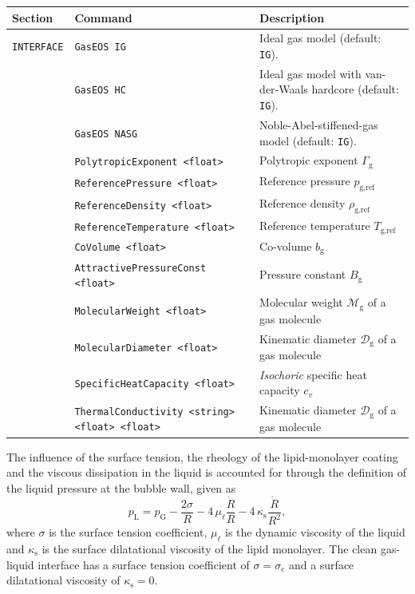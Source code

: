 \noindent
\begin{tabular}{p{} p{} p{}}
    \textbf{Section} &\textbf{Command} & \textbf{Description} 
\vspace{1mm} \\ \hline
{\tt INTERFACE} & {\tt GasEOS IG} & Ideal gas model (default: {\tt IG}).\\ 
& {\tt GasEOS HC} & Ideal gas model with van-der-Waals hardcore (default: {\tt IG}).\\ 
& {\tt GasEOS NASG} & Noble-Abel-stiffened-gas model (default: {\tt IG}).\\ 
& {\tt PolytropicExponent <float>} & Polytropic exponent $\Gamma_\text{g}$\\
& {\tt ReferencePressure <float>} & Reference pressure $p_\text{g,ref}$\\
& {\tt ReferenceDensity <float>} & Reference density $\rho_\text{g,ref}$\\
& {\tt ReferenceTemperature <float>} & Reference temperature $T_\text{g,ref}$\\
& {\tt CoVolume <float>} & Co-volume $b_\text{g}$\\
& {\tt AttractivePressureConst <float>} & Pressure constant $B_\text{g}$\\
& {\tt MolecularWeight <float>} & Molecular weight $\mathcal{M}_{\text{g}}$ of a gas molecule \\
& {\tt MolecularDiameter <float>} & Kinematic diameter $\mathcal{D}_{\text{g}}$ of a gas molecule \\
& {\tt SpecificHeatCapacity <float>} & {\it Isochoric} specific heat capacity $c_v$\\
& {\tt ThermalConductivity <string> <float> <float>} & Kinematic diameter $\mathcal{D}_{\text{g}}$ of a gas molecule \\
 \hline
\end{tabular} \vspace{1em}

The influence of the surface tension, the rheology of the lipid-monolayer coating and the viscous dissipation in the liquid is accounted for through the definition of the liquid pressure at the bubble wall, given as \citep{Marmottant2005}
\begin{equation}
p_\text{L} = p_\text{G} - \frac{2 \sigma}{R} - 4 \, \mu_\ell \frac{\dot{R}}{R} - 4 \, \kappa_\text{s} \frac{\dot{R}}{R^2} ,
\end{equation}
where $\sigma$ is the surface tension coefficient, $\mu_\ell$ is the dynamic viscosity of the liquid and $\kappa_\text{s}$ is the surface dilatational viscosity of the lipid monolayer.
The clean gas-liquid interface has a surface tension coefficient of $\sigma = \sigma_\text{c}$ and a surface dilatational viscosity of $\kappa_\text{s} = 0$. 


